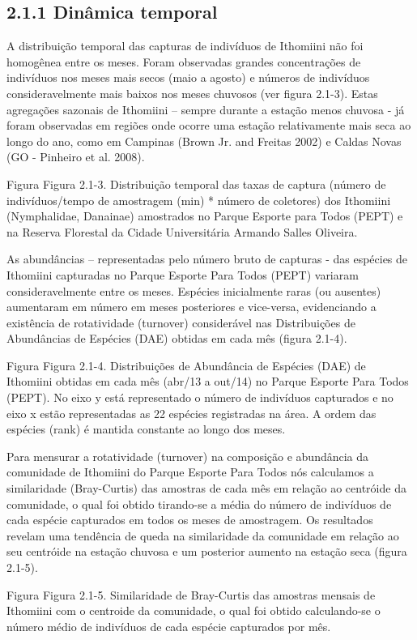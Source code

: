\subsection{2.1.1 Dinâmica temporal} %
\label{sec:dinamica-temporal-borb}
A distribuição temporal das capturas de indivíduos de Ithomiini não foi homogênea entre os meses. Foram observadas grandes concentrações de indivíduos nos meses mais secos (maio a agosto) e números de indivíduos consideravelmente mais baixos nos meses chuvosos (ver figura 2.1-3). Estas agregações sazonais de Ithomiini – sempre durante a estação menos chuvosa - já foram observadas em regiões onde ocorre uma estação relativamente mais seca ao longo do ano, como em Campinas (Brown Jr. and Freitas 2002) e Caldas Novas (GO - Pinheiro et al. 2008). 

Figura
Figura 2.1-3. Distribuição temporal das taxas de captura (número de indivíduos/tempo de amostragem (min) * número de coletores) dos Ithomiini (Nymphalidae, Danainae) amostrados no Parque Esporte para Todos (PEPT) e na Reserva Florestal da Cidade Universitária Armando Salles Oliveira.

As abundâncias – representadas pelo número bruto de capturas - das espécies de Ithomiini capturadas no Parque Esporte Para Todos (PEPT) variaram consideravelmente entre os meses. Espécies inicialmente raras (ou ausentes) aumentaram em número em meses posteriores e vice-versa, evidenciando a existência de rotatividade (turnover) considerável nas Distribuições de Abundâncias de Espécies (DAE) obtidas em cada mês (figura 2.1-4).  

Figura
Figura 2.1-4. Distribuições de Abundância de Espécies (DAE) de Ithomiini obtidas em cada mês (abr/13 a out/14) no Parque Esporte Para Todos (PEPT). No eixo y está representado o número de indivíduos capturados e no eixo x estão representadas as 22 espécies registradas na área. A ordem das espécies (rank) é mantida constante ao longo dos meses.

Para mensurar a rotatividade (turnover) na composição e abundância da comunidade de Ithomiini do Parque Esporte Para Todos nós calculamos a similaridade (Bray-Curtis) das amostras de cada mês em relação ao centróide da comunidade, o qual foi obtido tirando-se a média do número de indivíduos de cada espécie capturados em todos os meses de amostragem. Os resultados revelam uma tendência de queda na similaridade da comunidade em relação ao seu centróide na estação chuvosa e um posterior aumento na estação seca (figura 2.1-5).

Figura
Figura 2.1-5. Similaridade de Bray-Curtis das amostras mensais de Ithomiini com o centroide da comunidade, o qual foi obtido calculando-se o número médio de indivíduos de cada espécie capturados por mês.

